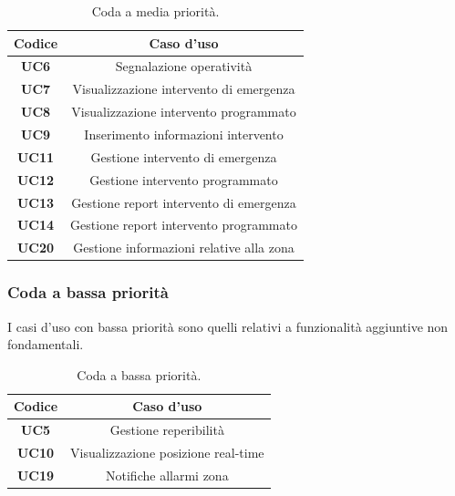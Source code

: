 	\begin{table}[h!]
		\centering
		\begin{tabular}{|c|c|}
			\hline
			\textbf{Codice} & \textbf{Caso d'uso} \\ \hline
			\textbf{UC6} & Segnalazione operatività\\ \hline
			\textbf{UC7} & Visualizzazione intervento di emergenza \\ \hline
			\textbf{UC8} & Visualizzazione intervento programmato \\ \hline
			\textbf{UC9} & Inserimento informazioni intervento \\ \hline
			\textbf{UC11} & Gestione intervento di emergenza \\ \hline
			\textbf{UC12} & Gestione intervento programmato \\ \hline
			\textbf{UC13} & Gestione report intervento di emergenza \\ \hline
			\textbf{UC14} & Gestione report intervento programmato \\ \hline
			\textbf{UC20} & Gestione informazioni relative alla zona \\ \hline
		\end{tabular}
		\caption{\label{tab:codaMediumPriority}Coda a media priorità.}
	\end{table}

\subsubsection{Coda a bassa priorità}
I casi d'uso con bassa priorità sono quelli relativi a funzionalità aggiuntive non fondamentali.
	\begin{table}[h!]
		\centering
		\begin{tabular}{|c|c|}
			\hline
			\textbf{Codice} & \textbf{Caso d'uso} \\ \hline
			\textbf{UC5} & Gestione reperibilità\\ \hline
			\textbf{UC10} & Visualizzazione posizione real-time\\ \hline
			\textbf{UC19} & Notifiche allarmi zona\\ \hline

		\end{tabular}
		\caption{\label{tab:codaLowPriority}Coda a bassa priorità.}
	\end{table}

